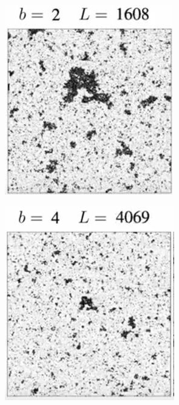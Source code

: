 \documentclass[]{article}
\begin{document}
\begin{figure}[H]
	\caption{Evolving $T=0.997T_c$ after \cite{ashton2012renormalization}}
	\begin{subfigure}[t]{0.3\textwidth}
		\includegraphics[width=\textwidth]{DouglasAshton1-1}
	\end{subfigure}
	\begin{subfigure}[t]{0.3\textwidth}
		\includegraphics[width=\textwidth]{DouglasAshton1-2}

\end{subfigure}
\end{figure}
\end{document}

